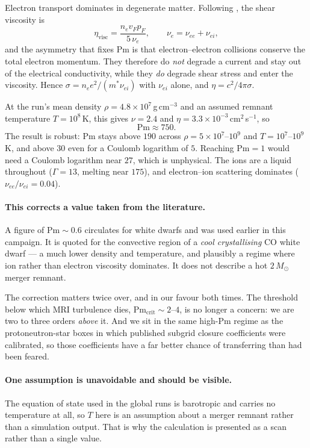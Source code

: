 \documentclass[11pt,a4paper]{article}
\newcommand{\Msun}{M_\odot}
\newcommand{\Pm}{\mathrm{Pm}}
\begin{document}
Electron transport dominates in degenerate matter. Following
\citet{shternin2008}, the shear viscosity is
\begin{equation}
  \eta_{\mathrm{visc}} = \frac{n_e v_F p_F}{5\,\nu_e},
  \qquad \nu_e = \nu_{ee} + \nu_{ei},
\end{equation}
and the asymmetry that fixes $\Pm$ is that electron--electron collisions
conserve the total electron momentum. They therefore do \emph{not} degrade a
current and stay out of the electrical conductivity, while they \emph{do}
degrade shear stress and enter the viscosity. Hence
$\sigma = n_e e^2/(m^\ast \nu_{ei})$ with $\nu_{ei}$ alone, and
$\eta = c^2/4\pi\sigma$.

At the run's mean density $\rho = 4.8\times10^{7}$\,g\,cm$^{-3}$ and an assumed
remnant temperature $T = 10^8$\,K, this gives $\nu = 2.4$ and
$\eta = 3.3\times10^{-3}$\,cm$^2$\,s$^{-1}$, so
\begin{equation}
  \boxed{\Pm \approx 750.}
\end{equation}
The result is robust: $\Pm$ stays above $190$ across
$\rho = 5\times10^7$--$10^9$ and $T = 10^7$--$10^9$\,K, and above $30$ even for
a Coulomb logarithm of $5$. Reaching $\Pm = 1$ would need a Coulomb logarithm
near $27$, which is unphysical. The ions are a liquid throughout
($\Gamma = 13$, melting near $175$), and electron--ion scattering dominates
($\nu_{ee}/\nu_{ei} = 0.04$).

\paragraph{This corrects a value taken from the literature.} A figure of
$\Pm \sim 0.6$ circulates for white dwarfs and was used earlier in this
campaign. It is quoted for the convective region of a \emph{cool crystallising}
CO white dwarf --- a much lower density and temperature, and plausibly a regime
where ion rather than electron viscosity dominates. It does not describe a hot
$2\,\Msun$ merger remnant.

The correction matters twice over, and in our favour both times. The threshold
below which MRI turbulence dies, $\Pm_{\mathrm{crit}} \sim 2$--$4$, is no longer
a concern: we are two to three orders \emph{above} it. And we sit in the same
high-$\Pm$ regime as the protoneutron-star boxes in which published subgrid
closure coefficients were calibrated, so those coefficients have a far better
chance of transferring than had been feared.

\paragraph{One assumption is unavoidable and should be visible.} The equation of
state used in the global runs is barotropic and carries no temperature at all,
so $T$ here is an assumption about a merger remnant rather than a simulation
output. That is why the calculation is presented as a scan rather than a single
value.
\end{document}
